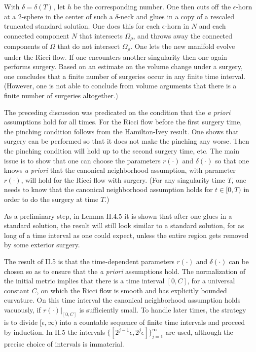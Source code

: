 With $\delta = \delta(T)$, let
$h$ be the corresponding number. One then
cuts off the $\epsilon$-horn at a $2$-sphere in the center of such a
$\delta$-neck and glues in a copy of a rescaled truncated standard solution.
One does this for each $\epsilon$-horn in $N$ and each connected component
$N$ that intersects $\Omega_\rho$, and throws away the connected components
of $\Omega$ that do not intersect $\Omega_\rho$. One lets the new manifold evolve
under the Ricci flow. If one encounters another singularity then one again
performs surgery.  Based on an estimate on the volume change under a surgery,
one concludes that a finite number of surgeries occur in any finite time
interval. (However,
one is not able to conclude from volume arguments that there is a finite
number of surgeries altogether.)

The preceding discussion was predicated on the condition that the
{\it a priori} assumptions hold for all times.  For the Ricci flow
before the first surgery time, the pinching condition
follows from the Hamilton-Ivey result.  One shows
that surgery can be performed so that it does not make the pinching any worse.
Then the pinching condition will hold up to the second surgery time, etc.
The main issue is to show that one can choose the parameters
$r(\cdot)$ and $\delta(\cdot)$ so that one knows {\it a priori} that the canonical
neighborhood assumption, with parameter $r(\cdot)$, will hold for the
Ricci flow with surgery. (For any singularity time $T$, one needs to know that the
canonical neighborhood assumption holds for $t \in [0, T)$ in order to do the
surgery at time $T$.)

As a preliminary step, in Lemma II.4.5 it is shown that after one glues in a standard
solution, the result will still look similar to a standard solution, for as long of
a time interval as one could expect, unless the entire region gets removed by some
exterior surgery.

The result of II.5 is that the time-dependent
parameters $r(\cdot)$ and $\delta(\cdot)$ can be
chosen so as to ensure that the {\it a priori} assumptions hold.
The normalization of the initial metric implies that there is a time
interval $[0, C]$, for a universal constant $C$, on which the
Ricci flow is smooth and has explicitly bounded curvature.
On this time interval the canonical neighborhood assumption
holds vacuously, if $r(\cdot) \big|_{[0,C]}$ is sufficiently small.
To handle later times, the strategy is to divide $[\epsilon, \infty)$ into
a countable sequence of finite time intervals and proceed by induction.
In II.5 the intervals $\{[2^{j-1} \epsilon, 2^j \epsilon]\}_{j=1}^\infty$ are used,
although the precise choice of intervals is immaterial.

